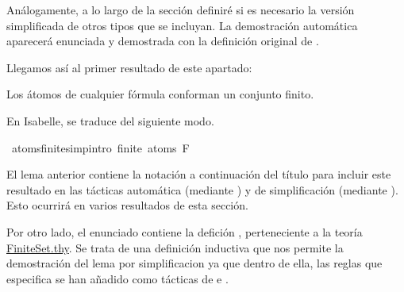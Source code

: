 \begin{isabellebody}
\begin{isamarkuptext}
Análogamente,
a lo largo de la sección definiré si es necesario la versión simplificada de otros tipos que se incluyan.
La demostración automática aparecerá enunciada y demostrada con la definición original de .%
\end{isamarkuptext}\isamarkuptrue%
%
\begin{isamarkuptext}%
Llegamos así al primer resultado de este apartado:
 \begin{lema}
    Los átomos de cualquier fórmula conforman un conjunto finito.
  \end{lema}%
\end{isamarkuptext}\isamarkuptrue%
%
\begin{isamarkuptext}%
En Isabelle, se traduce del siguiente modo.%
\end{isamarkuptext}\isamarkuptrue%
\isamarkupfalse%
\ atoms{\isacharunderscore}finite{\isacharbrackleft}simp{\isacharcomma}intro{\isacharbang}{\isacharbrackright}{\isacharcolon}\ {\isachardoublequoteopen}finite\ {\isacharparenleft}atoms\ F{\isacharparenright}{\isachardoublequoteclose}\isanewline
%
\isadelimproof
\ \ %
\endisadelimproof
%
\isatagproof
{}\isamarkupfalse%
%
\endisatagproof
{\isafoldproof}%
%
\isadelimproof
%
\endisadelimproof
%
\begin{isamarkuptext}%
El lema anterior contiene la notación  a continuación del título para incluir este
resultado en las tácticas automática (mediante ) y de simplificación (mediante ). 
Esto ocurrirá en varios resultados de esta sección.%
\end{isamarkuptext}\isamarkuptrue%
%
\begin{isamarkuptext}%
Por otro lado, el enunciado contiene la defición , perteneciente a la teoría 
\href{https://n9.cl/x86r}{FiniteSet.thy}. Se trata de una definición
inductiva que nos permite la demostración del lema por simplificacion ya que dentro de ella,
las reglas que especifica se han añadido como tácticas de  e .
\\
\\
\\
\\

\end{isamarkuptext}
\end{isabellebody}
